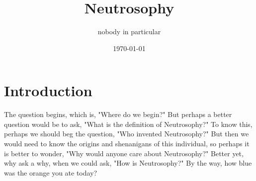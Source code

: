 \documentclass[11pt]{article}
\title{Neutrosophy}
\author{nobody in particular}
\date{\today}
\begin{document}
\maketitle

\section{Introduction}
The question begins, which is, "Where do we begin?" But perhaps a better question would be to ask, "What is the definition of Neutrosophy?" To know this, perhaps we should beg the question, "Who invented Neutrosophy?" But then we would need to know the origins and shenanigans of this individual, so perhaps it is better to wonder, "Why would anyone care about Neutrosophy?" Better yet, why ask a why, when we could ask, "How is Neutrosophy?" By the way, how blue was the orange you ate today?
\end{document}
